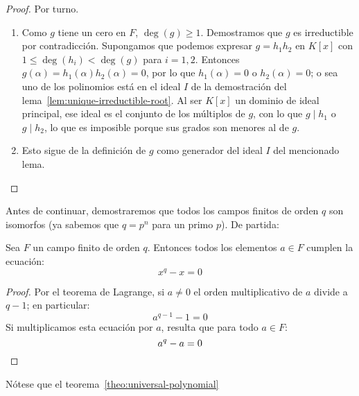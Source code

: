   \begin{proof}
    Por turno.
    \begin{enumerate}[label = (\roman*), ref = (\roman*)]
    \item
      Como \(g\) tiene un cero en \(F\),
      \(\deg(g) \ge 1\).
      Demostramos que \(g\) es irreductible por contradicción.
      Supongamos que podemos expresar \(g = h_1 h_2\) en \(K[x]\)
      con \(1 \le \deg(h_i) < \deg(g)\)
      para \(i = 1, 2\).
      Entonces \(g(\alpha) = h_1(\alpha) h_2(\alpha) = 0\),
      por lo que \(h_1(\alpha) = 0\) o \(h_2(\alpha) = 0\);
      o sea uno de los polinomios está en el ideal \(I\)%
      de la demostración
	del lema~\ref{lem:unique-irreductible-root}.
      Al ser \(K[x]\) un dominio de ideal principal,%
      ese ideal es el conjunto de los múltiplos de \(g\),
      con lo que \(g \mid h_1\) o \(g \mid h_2\),
      lo que es imposible porque sus grados son menores al de \(g\).
    \item
      Esto sigue de la definición de \(g\)
      como generador del ideal \(I\) del mencionado lema.
    \qedhere
    \end{enumerate}
  \end{proof}
  Antes de continuar,
  demostraremos que todos los campos finitos de orden \(q\)
  son isomorfos
  (ya sabemos que \(q = p^n\) para un primo \(p\)).
  De partida:
  \begin{theorem}
    \label{theo:universal-polynomial}
    Sea \(F\) un campo finito de orden \(q\).
    Entonces todos los elementos \(a \in F\)
    cumplen la ecuación:
    \begin{equation*}
      x^q - x = 0
    \end{equation*}
  \end{theorem}
  \begin{proof}
    Por el teorema de Lagrange,%
    si \(a \ne 0\) el orden multiplicativo de \(a\)
    divide a \(q - 1\);
    en particular:
    \begin{equation*}
      a^{q - 1} - 1
	= 0
    \end{equation*}
    Si multiplicamos esta ecuación por \(a\),
    resulta que para todo \(a \in F\):
    \begin{equation*}
      a^q - a
	= 0
      \qedhere
    \end{equation*}
  \end{proof}
  Nótese que el teorema~\ref{theo:universal-polynomial}
